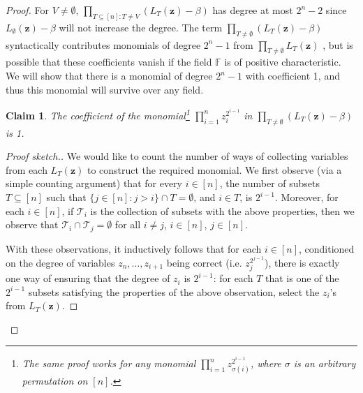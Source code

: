 \documentclass[11pt]{article}
\newtheorem{claim}[theorem]{Claim}
\newcommand{\F}{\mathbb{F}}
\begin{document}
\begin{proof}
    For $V \neq \emptyset$, $\prod_{T\subseteq [n]: T \neq V}({L_T(\mathbf{z})-\beta})$ has degree at most $2^n - 2$ since $L_{\emptyset}(\mathbf{z})-\beta$ will not increase the degree. The term $\prod_{T \neq \emptyset}({L_T(\mathbf{z})-\beta})$ syntactically contributes monomials of degree $2^n - 1$ from $\prod_{T \neq \emptyset}L_T(\mathbf{z})$ , but is possible that these coefficients vanish if the field $\F$ is of positive characteristic. We will show that there is a monomial of degree $2^n - 1$ with coefficient 1, and thus this monomial will survive over any field.
    \begin{claim}
        The coefficient of the monomial\footnote{The same proof works for any monomial $\prod_{i=1}^n {z_{\sigma(i)}^{2^{i-1}}}$, where $\sigma$ is an arbitrary permutation on $[n]$.} $\prod_{i=1}^n {z_i^{2^{i-1}}}$ in $\prod_{T \neq \emptyset}({L_T(\mathbf{z})-\beta})$ is 1. 
    \end{claim}
    \begin{proof}[Proof sketch.] We would like to count the number of ways of collecting variables from each $L_T(\mathbf{z})$ to construct the required monomial.
    We first observe (via a simple counting argument) that for every $i\in [n]$, the number of subsets $T\subseteq [n]$ such that 
        $\{j\in[n]: j>i\} \cap T = \emptyset$, and
         $i \in T$,
    is $2^{i-1}$. Moreover, for each $i\in[n]$, if $\mathcal{T}_i$ is the collection of subsets with the above properties, then we observe that $\mathcal{T}_i \cap \mathcal{T}_j = \emptyset$ for all $i \neq j$, $i\in[n]$, $j\in [n]$.
        
    With these observations, it inductively follows that for each $i \in [n]$, conditioned on the degree of variables $z_n, \dots, z_{i+1}$ being correct (i.e. $z_j^{2^{j-1}}$), there is exactly one way of ensuring that the degree of $z_{i}$ is $2^{i-1}$: for each $T$ that is one of the $2^{i-1}$ subsets satisfying the properties of the above observation, select the $z_i$'s from $L_T(\mathbf{z})$.
    \end{proof}
\end{proof}
\end{document}
